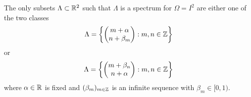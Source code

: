 \documentclass[../thesis.tex]{subfiles}
\begin{document}
\begin{theorem}\label{thrm:class_all_shift_2d}
    The only subsets $\Lambda \subset \mathbb{R}^2$ such that $\Lambda$ is a spectrum for $\Omega = I^2$ are either one of the two classes
    \begin{equation}\label{eq:2d_all_shift_class_1}
        \Lambda = \left\{
            \begin{pmatrix}
            m + \alpha \\
            n + \beta_m
            \end{pmatrix} : m,n \in  \mathbb{Z}
            \right\}
    \end{equation}
    or
    \begin{equation}\label{eq:2d_all_shift_class_2}
        \Lambda = \left\{
            \begin{pmatrix}
            m + \beta_n\\
            n + \alpha
            \end{pmatrix} : m,n \in  \mathbb{Z}
            \right\}
    \end{equation}
    where $\alpha \in \mathbb{R}$ is fixed and $(\beta_m)_{m\in \mathbb{Z}}$ is an infinite sequence with $\beta_m \in [0,1)$.
\end{theorem}
\end{document}
